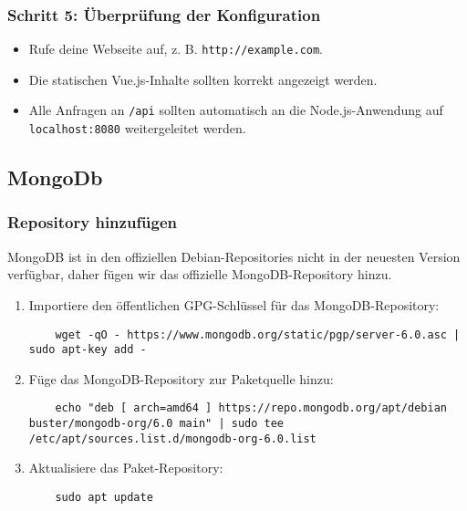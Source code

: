 \documentclass[a4paper,12pt]{article}
\begin{document}
\subsubsection{Schritt 5: Überprüfung der Konfiguration}
\begin{itemize}
    \item Rufe deine Webseite auf, z. B. \texttt{http://example.com}.
    \item Die statischen Vue.js-Inhalte sollten korrekt angezeigt werden.
    \item Alle Anfragen an \texttt{/api} sollten automatisch an die Node.js-Anwendung auf \texttt{localhost:8080} weitergeleitet werden.
\end{itemize}

\subsection{MongoDb}

\subsubsection{Repository hinzufügen}
MongoDB ist in den offiziellen Debian-Repositories nicht in der neuesten Version verfügbar, daher fügen wir das offizielle MongoDB-Repository hinzu.

\begin{enumerate}
    \item Importiere den öffentlichen GPG-Schlüssel für das MongoDB-Repository:

    \begin{lstlisting}
    wget -qO - https://www.mongodb.org/static/pgp/server-6.0.asc | sudo apt-key add -
    \end{lstlisting}

    \item Füge das MongoDB-Repository zur Paketquelle hinzu:

    \begin{lstlisting}
    echo "deb [ arch=amd64 ] https://repo.mongodb.org/apt/debian buster/mongodb-org/6.0 main" | sudo tee /etc/apt/sources.list.d/mongodb-org-6.0.list
    \end{lstlisting}
    
    \item Aktualisiere das Paket-Repository:

    \begin{lstlisting}
    sudo apt update
    \end{lstlisting}
    
\end{enumerate}
\end{document}
